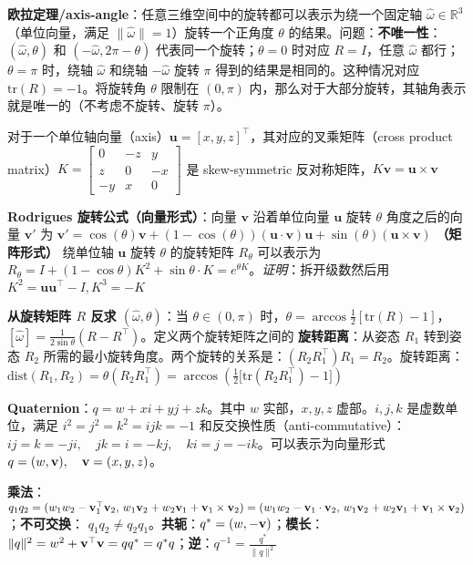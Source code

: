 \documentclass[
  8pt]{extarticle}
\begin{document}
\begin{multicols*}{4}
\textbf{欧拉定理/axis-angle}：任意三维空间中的旋转都可以表示为绕一个固定轴
\(\hat{\omega} \in \mathbb{R}^3\)（单位向量，满足
\(\|\hat{\omega}\| = 1\)）旋转一个正角度 \(\theta\)
的结果。问题：\textbf{不唯一性}：\((\hat{\omega}, \theta)\) 和
\((-\hat{\omega}, 2\pi -\theta)\) 代表同一个旋转；\(\theta=0\) 时对应
\(R=I\)，任意 \(\hat{\omega}\) 都行；\(\theta = \pi\) 时，绕轴
\(\hat{\omega}\) 和绕轴 \(-\hat{\omega}\) 旋转 \(\pi\)
得到的结果是相同的。这种情况对应 \(\text{tr}(R) = -1\)。将旋转角
\(\theta\) 限制在 \((0, \pi)\)
内，那么对于大部分旋转，其轴角表示就是唯一的（不考虑不旋转、旋转
\(\pi\)）。

对于一个单位轴向量（axis）\(\mathbf{u} = [x, y, z]^\top\)，其对应的叉乘矩阵（cross
product
matrix）\(K = \begin{bmatrix}0 & -z & y \\z & 0 & -x \\-y & x & 0\end{bmatrix}\)
是 skew-symmetric
反对称矩阵，\(K\mathbf{v} = \mathbf{u} \times \mathbf{v}\)

\textbf{Rodrigues 旋转公式（向量形式）}：向量 \(\mathbf{v}\)
沿着单位向量 \(\mathbf{u}\) 旋转 \(\theta\) 角度之后的向量
\(\mathbf{v}'\) 为
\(\mathbf{v}' = \cos(\theta)\mathbf{v} + (1 - \cos(\theta))(\mathbf{u} \cdot \mathbf{v})\mathbf{u} + \sin(\theta)(\mathbf{u} \times \mathbf{v})\)
\textbf{（矩阵形式）} 绕单位轴 \(\mathbf{u}\) 旋转 \(\theta\) 的旋转矩阵
\(R_\theta\) 可以表示为
\(R_\theta = I + (1-\cos\theta) K^2 + \sin\theta \cdot K = e^{\theta K}\)。\emph{证明}：拆开级数然后用
\(K^2 = \mathbf{u}\mathbf{u}^\top - I,K^3=-K\)

\textbf{从旋转矩阵 \(R\) 反求 \((\hat{\omega}, \theta)\)}：当
\(\theta \in (0, \pi)\)
时，\(\theta = \arccos \frac{1}{2}[\text{tr}(R) - 1]\)，\([\hat{\omega}] = \frac{1}{2 \sin \theta}(R - R^\top)\)。定义两个旋转矩阵之间的
\textbf{旋转距离}：从姿态 \(R_1\) 转到姿态 \(R_2\)
所需的最小旋转角度。两个旋转的关系是：\((R_2 R_1^\top) R_1 = R_2\)。旋转距离：\(\text{dist}(R_1, R_2) = \theta(R_2 R_1^\top) = \arccos\left(\frac{1}{2} \big[\text{tr}(R_2 R_1^\top) - 1\big]\right)\)

\textbf{Quaternion}：\(q = w + xi + yj + zk\)。其中 \(w\)
实部，\(x,y,z\) 虚部。\(i, j, k\) 是虚数单位，满足
\(i^2 = j^2 = k^2 = ijk = -1\)
和反交换性质（anti-commutative）：\(ij = k = -ji, \quad jk = i = -kj, \quad ki = j = -ik\)。可以表示为向量形式
\(q = (w, \bold{v}), \quad \bold{v} = (x, y, z)\)。

\textbf{乘法}：\(q_1 q_2 = (w_1 w_2 - \bold{v}_1^{\top} \bold{v}_2, \, w_1 \bold{v}_2 + w_2 \bold{v}_1 + \bold{v}_1 \times \bold{v}_2) = (w_1 w_2 - \bold{v}_1 \cdot \bold{v}_2, \, w_1 \bold{v}_2 + w_2 \bold{v}_1 + \bold{v}_1 \times \bold{v}_2)\)；\textbf{不可交换}：
\(q_1 q_2 \neq q_2 q_1\)。\textbf{共轭}：\(q^* = (w, -\bold{v})\)；\textbf{模长}：\(\|q\|^2 = w^2 + \bold{v}^{\top} \bold{v} = qq^* = q^*q\)；\textbf{逆}：\(q^{-1} = \frac{q^*}{\|q\|^2}\)


\end{multicols*}
\end{document}
